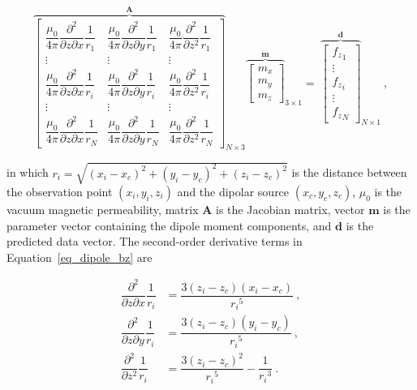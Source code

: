 \documentclass[onecolumn,12pt,a4paper]{article}
\begin{document}
     \begin{equation}
    \label{eq_dipole_bz}
    {\overbrace{\begin{bmatrix}
    \dfrac{\mu_0}{4\pi} \dfrac{\partial^2}{\partial z \partial x} \dfrac{1}{r_1}
    & \dfrac{\mu_0}{4\pi} \dfrac{\partial^2}{\partial z \partial y} \dfrac{1}{r_1}
    & \dfrac{\mu_0}{4\pi} \dfrac{\partial^2}{\partial z^2} \dfrac{1}{r_1}
    \\
    \vdots & \vdots & \vdots
    \\
    \dfrac{\mu_0}{4\pi} \dfrac{\partial^2}{\partial z \partial x} \dfrac{1}{r_i}
    & \dfrac{\mu_0}{4\pi} \dfrac{\partial^2}{\partial z \partial y} \dfrac{1}{r_i}
    & \dfrac{\mu_0}{4\pi} \dfrac{\partial^2}{\partial z^2} \dfrac{1}{r_i}
    \\
    \vdots & \vdots & \vdots
    \\
    \dfrac{\mu_0}{4\pi} \dfrac{\partial^2}{\partial z \partial x} \dfrac{1}{r_N}
    & \dfrac{\mu_0}{4\pi} \dfrac{\partial^2}{\partial z \partial y} \dfrac{1}{r_N}
    & \dfrac{\mu_0}{4\pi} \dfrac{\partial^2}{\partial z^2} \dfrac{1}{r_N}
    \end{bmatrix}}^{\mathbf{A}}}_{N \times 3}
    {\overbrace{{\begin{bmatrix}
    m_x \\ m_y \\ m_z
    \end{bmatrix}}}^{\mathbf{m}}}_{3 \times 1}
    =
    ~{\overbrace{\begin{bmatrix}
    {f_z}_1
    \\
    \vdots
    \\
    {f_z}_i
    \\
    \vdots
    \\
    {f_z}_N
    \end{bmatrix}}^{\mathbf{d}}}_{N \times 1}
    \ ,
    \end{equation}

    \noindent
    in which $r_i = \sqrt{(x_i - x_c)^2 + (y_i - y_c)^2 + (z_i - z_c)^2}$ is the distance between the observation point $(x_i, y_i, z_i)$ and the dipolar source $(x_c, y_c, z_c)$, $\mu_0$ is the vacuum magnetic permeability, matrix $\mathbf{A}$ is the Jacobian matrix, vector $\mathbf{m}$ is the parameter vector containing the dipole moment components, and $\mathbf{d}$ is the predicted data vector. The second-order derivative terms in Equation~\ref{eq_dipole_bz} are

    \begin{equation}
    \begin{aligned}
    \dfrac{\partial^2}{\partial z \partial x} \dfrac{1}{r_i} &=
    \dfrac{3(z_i - z_c)(x_i - x_c)}{{r_i}^5}\ ,
    \\
    \dfrac{\partial^2}{\partial z \partial y} \dfrac{1}{r_i} &=
    \dfrac{3(z_i - z_c)(y_i - y_c)}{{r_i}^5}\ ,
    \\
    \dfrac{\partial^2}{\partial z^2} \dfrac{1}{r_i} &=
    \dfrac{3(z_i - z_c)^2}{{r_i}^5} - \dfrac{1}{{r_i}^3}\ .
    \end{aligned}
    \end{equation}
\end{document}
